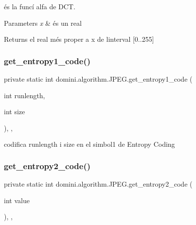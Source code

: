 és la funcí alfa de D\+CT. 


\begin{DoxyParams}{Parameters}
{\em x} & és un real \\
\hline
\end{DoxyParams}
\begin{DoxyReturn}{Returns}
el real més proper a x de l\textquotesingle{}interval \mbox{[}0..255\mbox{]} 
\end{DoxyReturn}
\mbox{\label{classdomini_1_1algorithm_1_1JPEG_a0f897c6c525d81551539df1eb8db7e12}} 
\subsubsection{\texorpdfstring{get\+\_\+entropy1\+\_\+code()}{get\_entropy1\_code()}}
{\footnotesize\ttfamily private static int domini.\+algorithm.\+J\+P\+E\+G.\+get\+\_\+entropy1\+\_\+code (\begin{DoxyParamCaption}\item[{int}]{runlength,  }\item[{int}]{size }\end{DoxyParamCaption})\hspace{0.3cm}{\ttfamily [inline]}, {\ttfamily [static]}, {\ttfamily [private]}}



codifica runlength i size en el simbol1 de Entropy Coding 

\mbox{\label{classdomini_1_1algorithm_1_1JPEG_a0ccbcda5311dc96a30e5cb7f2a5b95b5}} 
\subsubsection{\texorpdfstring{get\+\_\+entropy2\+\_\+code()}{get\_entropy2\_code()}}
{\footnotesize\ttfamily private static int domini.\+algorithm.\+J\+P\+E\+G.\+get\+\_\+entropy2\+\_\+code (\begin{DoxyParamCaption}\item[{int}]{value }\end{DoxyParamCaption})\hspace{0.3cm}{\ttfamily [inline]}, {\ttfamily [static]}, {\ttfamily [private]}}



